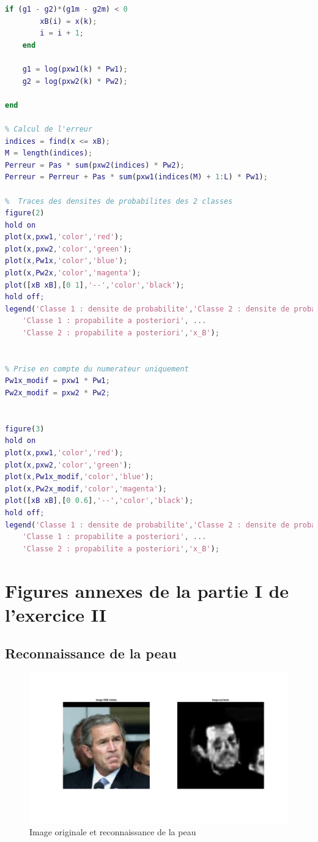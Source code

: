 \documentclass[11pt,a4paper]{article}
\begin{document}
\begin{lstlisting}[language=matlab]
    if (g1 - g2)*(g1m - g2m) < 0
        xB(i) = x(k);
        i = i + 1;
    end
    
    g1 = log(pxw1(k) * Pw1);
    g2 = log(pxw2(k) * Pw2);
    
end

% Calcul de l'erreur
indices = find(x <= xB);
M = length(indices);
Perreur = Pas * sum(pxw2(indices) * Pw2);
Perreur = Perreur + Pas * sum(pxw1(indices(M) + 1:L) * Pw1);

%  Traces des densites de probabilites des 2 classes
figure(2) 
hold on
plot(x,pxw1,'color','red');
plot(x,pxw2,'color','green');
plot(x,Pw1x,'color','blue');
plot(x,Pw2x,'color','magenta');
plot([xB xB],[0 1],'--','color','black');
hold off;
legend('Classe 1 : densite de probabilite','Classe 2 : densite de probabilite', ...
	'Classe 1 : propabilite a posteriori', ...
	'Classe 2 : propabilite a posteriori','x_B');

    
% Prise en compte du numerateur uniquement
Pw1x_modif = pxw1 * Pw1;
Pw2x_modif = pxw2 * Pw2;


figure(3) 
hold on
plot(x,pxw1,'color','red');
plot(x,pxw2,'color','green');
plot(x,Pw1x_modif,'color','blue');
plot(x,Pw2x_modif,'color','magenta');
plot([xB xB],[0 0.6],'--','color','black');
hold off;
legend('Classe 1 : densite de probabilite','Classe 2 : densite de probabilite', ...
	'Classe 1 : propabilite a posteriori', ...
	'Classe 2 : propabilite a posteriori','x_B');
\end{lstlisting}

\newpage
\section{Figures annexes de la partie I de l'exercice II}
\subsection{Reconnaissance de la peau}
\label{an.reconn}

\begin{figure}[H]
\center
\includegraphics[width=15cm]{exo2_skin2.png}
\caption{Image originale et reconnaissance de la peau}

\end{figure}
\end{document}
